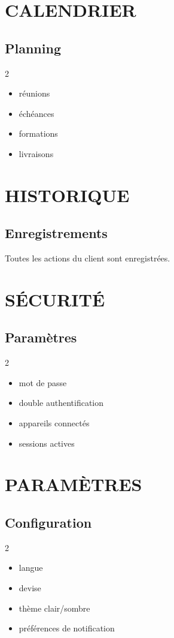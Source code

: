 \documentclass[12pt,a4paper,oneside]{book}
\begin{document}
\chapter{CALENDRIER}

\section{Planning}
\begin{multicols}{2}
\begin{itemize}
\item réunions
\item échéances
\item formations
\item livraisons
\end{itemize}
\end{multicols}

\chapter{HISTORIQUE}

\section{Enregistrements}
Toutes les actions du client sont enregistrées.

\chapter{SÉCURITÉ}

\section{Paramètres}
\begin{multicols}{2}
\begin{itemize}
\item mot de passe
\item double authentification
\item appareils connectés
\item sessions actives
\end{itemize}
\end{multicols}

\chapter{PARAMÈTRES}

\section{Configuration}
\begin{multicols}{2}
\begin{itemize}
\item langue
\item devise
\item thème clair/sombre
\item préférences de notification
\end{itemize}
\end{multicols}
\end{document}
